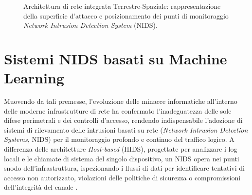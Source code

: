 \begin{figure}[H]
    \caption{Architettura di rete integrata Terrestre-Spaziale: rappresentazione della superficie d'attacco e posizionamento dei punti di monitoraggio \textit{Network Intrusion Detection System} (NIDS).}
    \label{fig:architettura_ibrida}
\end{figure}

\section{Sistemi NIDS basati su Machine Learning}
\label{sec:ids_ml}

Muovendo da tali premesse, l'evoluzione delle minacce informatiche all'interno delle moderne infrastrutture di rete ha confermato l'inadeguatezza delle sole difese perimetrali e dei controlli d'accesso, rendendo indispensabile l'adozione di sistemi di rilevamento delle intrusioni basati su rete (\textit{Network Intrusion Detection Systems}, NIDS) per il monitoraggio profondo e continuo del traffico logico.
A differenza delle architetture \textit{Host-based} (HIDS), progettate per analizzare i log locali e le chiamate di sistema del singolo dispositivo, un NIDS opera nei punti snodo dell'infrastruttura, ispezionando i flussi di dati per identificare tentativi di accesso non autorizzato, violazioni delle politiche di sicurezza o compromissioni dell'integrità del canale \cite{hindy2020}.

